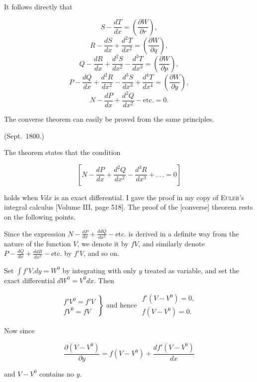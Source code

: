 It follows directly that

\[
S - \frac{dT}{dx} = \left(\frac{\partial W}{\partial r}\right),
\]
\[
R - \frac{dS}{dx} + \frac{d^2T}{dx^2} = \left(\frac{\partial W}{\partial q}\right),
\]
\[
Q - \frac{dR}{dx} + \frac{d^2S}{dx^2} - \frac{d^3T}{dx^3} = \left(\frac{\partial W}{\partial p}\right),
\]
\[
P - \frac{dQ}{dx} + \frac{d^2R}{dx^2} - \frac{d^3S}{dx^3} + \frac{d^4T}{dx^4} = \left(\frac{\partial W}{\partial y}\right),
\]
\[
N - \frac{dP}{dx} + \frac{d^2Q}{dx^2} - \text{etc.} = 0.
\]

The converse theorem can easily be proved from the same principles.

\noindent (Sept.\ 1800.)

\par\smallskip\hrulefill\smallskip\par

\noindent\hspace*{\parindent}The theorem states that the condition

\[
\left[N - \frac{dP}{dx} + \frac{d^2Q}{dx^2} - \frac{d^3R}{dx^3} + .\,.\,. = 0\right]
\]

\noindent holds when $Vdx$ is an exact differential. I gave the proof in my copy of \textsc{Euler}’s integral calculus [Volume III, page 518]. The proof of the [converse] theorem rests on the following points.

Since the expression $N - \frac{dP}{dx} + \frac{ddQ}{dx^2} - \text{etc.}$ is derived in a definite way from the nature of the function $V$, we denote it by $fV$, and similarly denote $P - \frac{dQ}{dx} + \frac{ddR}{dx^2} - \text{etc.}$ by $f'V$, and so on.

Set $\int f'V  .  dy = W^0$ by integrating with only $y$ treated as variable, and set the exact differential $dW^0 = V^0dx$. Then

\[
\left.\begin{array}{l}
f'V^0 = f'V \\
fV^0 = fV
\end{array}\right\}
\text{ and hence }
\begin{array}{l}
f'(V - V^0) = 0, \\
f(V - V^0) = 0.
\end{array}
\]

\noindent Now since

\[
\frac{\partial(V - V^0)}{\partial y} = f(V - V^0) + \frac{df'(V - V^0)}{dx}
\]

\noindent [holds,. we also have $\dfrac{\partial(V - V^0)}{\partial y} = 0$] and $V - V^0$ contains no $y$.


